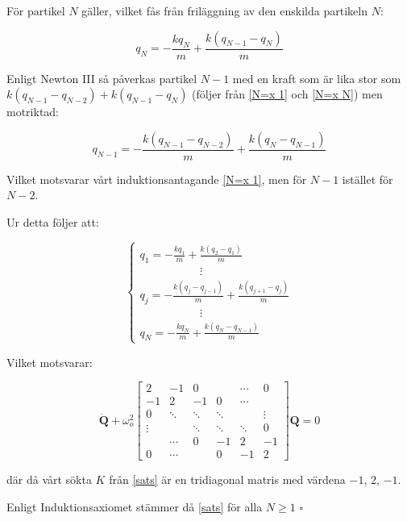 \documentclass[12pt,a4paper]{article}
\begin{document}
\begin{appendix}
		För partikel $N$ gäller, vilket fås från friläggning av den enskilda partikeln $N$:
		
		\begin{equation}
			q_N = -\frac{k q_N}{m} + \frac{k (q_{N-1} - q_N)}{m}
			\label{N=x N}
		\end{equation}
		
		Enligt Newton III så påverkas partikel $N - 1$ med en kraft som är lika stor
		som $k(q_{N-1} - q_{N-2}) + k (q_{N-1} - q_N)$ (följer från \ref{N=x 1} och \ref{N=x N})
		men motriktad:
		
		\begin{equation}
			q_{N-1} = -\frac{k(q_{N-1}-q_{N-2})}{m} + \frac{k (q_N - q_{N-1})}{m}
		\end{equation}
		
		Vilket motsvarar vårt induktionsantagande \eqref{N=x 1}, men för $N-1$ istället för $N-2$.
		
		Ur detta följer att:
		
		\begin{equation*}
			\begin{cases}
				q_1 = -\frac{k q_1}{m} + \frac{k(q_2 - q_1)}{m} \\
				\hspace{64pt} \vdots \\
				q_j = -\frac{k (q_j - q_{j-1})}{m} + \frac{k(q_{j+1}-q_j)}{m} \\
				\hspace{64pt} \vdots \\
				q_N = -\frac{k q_N}{m} + \frac{k (q_N - q_{N-1})}{m}
			\end{cases}
		\end{equation*}
		
		Vilket motsvarar:
		
		\begin{equation*}
			\mathbf{\ddot{Q}} + \omega_o^2 \begin{bmatrix}
				2 & -1 & 0 & & \cdots & 0 \\
				-1 & 2 & -1 & 0 & \cdots & \\
				0 & \ddots & \ddots & \ddots & & \vdots \\
				\vdots &  & \ddots & \ddots & \ddots & 0 \\
				& \cdots & 0 & -1 & 2  & -1 \\
				0 & \cdots & & 0 & -1 & 2
			\end{bmatrix} \mathbf{Q} = 0
		\end{equation*}
		
		där då vårt sökta $K$ från \ref{sats} är en tridiagonal matris med värdena $-1$, $2$, $-1$.
		
		Enligt Induktionsaxiomet stämmer då \ref{sats} för alla $N \geq 1$ \hfill $\square$
		
	\end{appendix}
\end{document}
